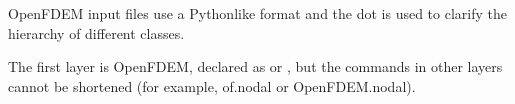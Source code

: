 \documentclass[letterpaper,10pt,english]{sphinxmanual}
\begin{document}
\begin{sphinxVerbatim}[commandchars=\\\{\}]
 

 
 
\end{sphinxVerbatim}

OpenFDEM input files use a Python\sphinxhyphen{}like format and the dot is used to
clarify the hierarchy of different classes.

The first layer is OpenFDEM, declared as  or , but the
commands in other layers cannot be shortened (for example, of.nodal or
OpenFDEM.nodal).
\end{document}
